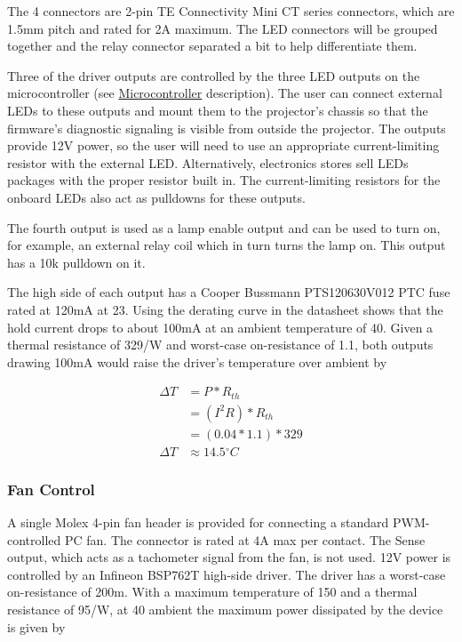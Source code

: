\documentclass{article}
\newcommand{\degree}{\ensuremath{^{\circ}}}
\begin{document}
The 4 connectors are 2-pin TE Connectivity Mini CT series connectors, which are 1.5mm pitch and
rated for 2A maximum.  The LED connectors will be grouped together and the relay connector separated
a bit to help differentiate them.

Three of the driver outputs are controlled by the three LED outputs on the microcontroller (see
\hyperref[sssec:Microcontroller]{Microcontroller} description).  The user can connect external LEDs
to these outputs and mount them to the projector's chassis so that the firmware's diagnostic
signaling is visible from outside the projector.  The outputs provide 12V power, so the user will
need to use an appropriate current-limiting resistor with the external LED.  Alternatively,
electronics stores sell LEDs packages with the proper resistor built in.  The current-limiting
resistors for the onboard LEDs also act as pulldowns for these outputs.

The fourth output is used as a lamp enable output and can be used to turn on, for example, an
external relay coil which in turn turns the lamp on.  This output has a 10k pulldown on it.

The high side of each output has a Cooper Bussmann PTS120630V012 PTC fuse rated at 120mA at
23\textcelsius{}.  Using the derating curve in the datasheet shows that the hold current drops to
about 100mA at an ambient temperature of 40\textcelsius{}.  Given a thermal resistance of
329\textcelsius{}/W and worst-case on-resistance of 1.1\textOmega, both outputs drawing 100mA would
raise the driver's temperature over ambient by

\begin{align*}
    \Delta T &= P * R_{th} \\
    &= (I^2R) * R_{th} \\
    &= (0.04 * 1.1) * 329 \\
    \Delta T &\approx 14.5\degree C
\end{align*}

\subsubsection{Fan Control} \label{sssec:FanControl}
A single Molex 4-pin fan header is provided for connecting a standard PWM-controlled PC fan.  The
connector is rated at 4A max per contact.  The Sense output, which acts as a tachometer signal from
the fan, is not used.  12V power is controlled by an Infineon BSP762T high-side driver.  The driver
has a worst-case on-resistance of 200m\textOmega.  With a maximum temperature of 150\textcelsius{}
and a thermal resistance of 95\textcelsius{}/W, at 40\textcelsius{} ambient the maximum power
dissipated by the device is given by
\end{document}
